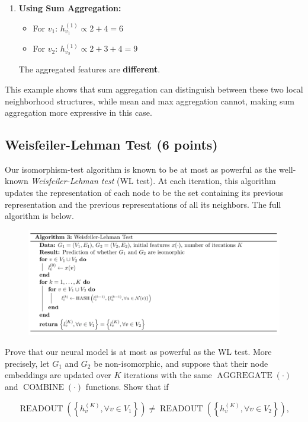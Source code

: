 \documentclass{article}
\numberwithin{figure}{section}
\begin{document}
{\begin{enumerate}
			\item \textbf{Using Sum Aggregation:}
			\begin{itemize}
				\item For $v_1$: $h^{(1)}_{v_1} \propto 2+4 = 6$
				\item For $v_2$: $h^{(1)}_{v_2} \propto 2+3+4 = 9$
			\end{itemize}
			The aggregated features are \textbf{different}.
		\end{enumerate}
		
		This example shows that sum aggregation can distinguish between these two local neighborhood structures, while mean and max aggregation cannot, making sum aggregation more expressive in this case.
	}
	
	
	\subsection{Weisfeiler-Lehman Test (6 points)}
	Our isomorphism-test algorithm is known to be at most as powerful as the well-known \textit{Weisfeiler-Lehman test} (WL test). At each iteration, this algorithm updates the representation of each node to be the set containing its previous representation and the previous representations of all its neighbors. The full algorithm is below.
	
	\begin{figure}[H]
		\centering
		\includegraphics[width=1.0\textwidth]{algo-3.png}
		\label{fig:my_label}
	\end{figure}
	
	Prove that our neural model is at most as powerful as the WL test. More precisely, let $G_1$ and $G_2$ be non-isomorphic, and suppose that their node embeddings are updated over $K$ iterations with the same $\operatorname{AGGREGATE}(\cdot)$ and $\operatorname{COMBINE}(\cdot)$ functions. Show that if
	
	$$\operatorname { READOUT }\left(\left\{h_v^{(K)}, \forall v \in V_1\right\}\right) \neq \operatorname { READOUT }\left(\left\{h_v^{(K)}, \forall v \in V_2\right\}\right),$$
	
\end{document}

